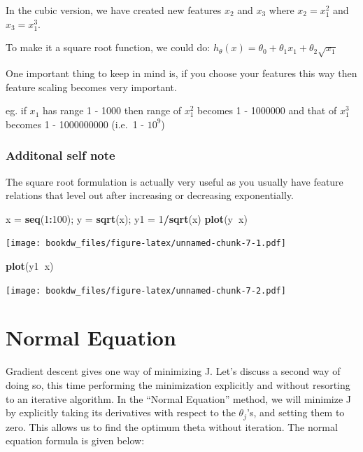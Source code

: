 \documentclass[
]{book}
\newenvironment{Shaded}{\begin{snugshade}}{\end{snugshade}}
\newcommand{\DecValTok}[1]{\textcolor[rgb]{0.00,0.00,0.81}{#1}}
\newcommand{\KeywordTok}[1]{\textcolor[rgb]{0.13,0.29,0.53}{\textbf{#1}}}
\newcommand{\NormalTok}[1]{#1}
\newcommand{\OperatorTok}[1]{\textcolor[rgb]{0.81,0.36,0.00}{\textbf{#1}}}
\newcommand{\StringTok}[1]{\textcolor[rgb]{0.31,0.60,0.02}{#1}}
\begin{document}
In the cubic version, we have created new features \(x_2\) and \(x_3\) where \(x_2 = x_1^2\) and \(x_3 = x_1^3\).

To make it a square root function, we could do: \(h_\theta(x) = \theta_0 + \theta_1 x_1 + \theta_2 \sqrt{x_1}\)

One important thing to keep in mind is, if you choose your features this way then feature scaling becomes very important.

eg. if \(x_1\) has range 1 - 1000 then range of \(x_1^2\) becomes 1 - 1000000 and that of \(x_1^3\) becomes 1 - 1000000000 (i.e.~1 - \(10^9\))

\hypertarget{additonal-self-note-1}{%
\subsubsection{Additonal self note}\label{additonal-self-note-1}}

{
The square root formulation is actually very useful as you usually have feature relations that level out after increasing or decreasing exponentially.
}

\begin{Shaded}
\begin{Highlighting}[]
\NormalTok{x =}\StringTok{ }\KeywordTok{seq}\NormalTok{(}\DecValTok{1}\OperatorTok{:}\DecValTok{100}\NormalTok{); y =}\StringTok{ }\KeywordTok{sqrt}\NormalTok{(x); y1 =}\StringTok{ }\DecValTok{1}\OperatorTok{/}\KeywordTok{sqrt}\NormalTok{(x)}
\KeywordTok{plot}\NormalTok{(y}\OperatorTok{~}\NormalTok{x)}
\end{Highlighting}
\end{Shaded}

\texttt{[image: bookdw\_files/figure-latex/unnamed-chunk-7-1.pdf]}

\begin{Shaded}
\begin{Highlighting}[]
\KeywordTok{plot}\NormalTok{(y1}\OperatorTok{~}\NormalTok{x)}
\end{Highlighting}
\end{Shaded}

\texttt{[image: bookdw\_files/figure-latex/unnamed-chunk-7-2.pdf]}

\hypertarget{normal-equation}{%
\section{Normal Equation}\label{normal-equation}}

Gradient descent gives one way of minimizing J. Let's discuss a second way of doing so, this time performing the minimization explicitly and without resorting to an iterative algorithm. In the ``Normal Equation'' method, we will minimize J by explicitly taking its derivatives with respect to the \(θ_j’\)s, and setting them to zero. This allows us to find the optimum theta without iteration. The normal equation formula is given below:
\end{document}
